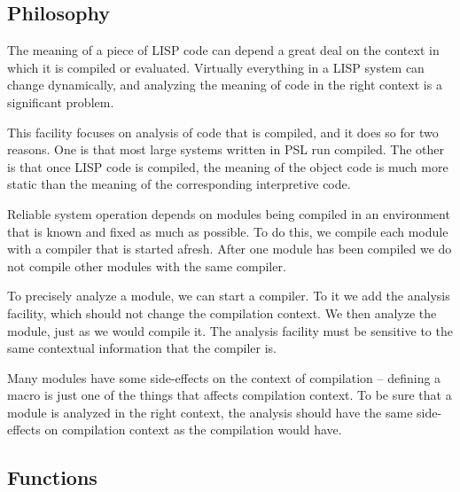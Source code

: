\subsection{Philosophy}

  The meaning of a piece of LISP code can depend a great deal on
the context in which it is compiled  or  evaluated.    Virtually
everything   in  a  LISP  system  can  change  dynamically,  and
analyzing the  meaning  of  code  in  the  right  context  is  a
significant problem.

  This  facility  focuses  on analysis of code that is compiled,
and it does so for two reasons.  One is that most large  systems
written  in  PSL run compiled.  The other is that once LISP code
is compiled, the meaning of the object code is much more  static
than the meaning of the corresponding interpretive code.

  Reliable system operation depends on modules being compiled in
an  environment that is known and fixed as much as possible.  To
do this, we compile each module with a compiler that is  started
afresh. After  one module has been compiled we do not compile
other modules with the same compiler.

  To precisely analyze a module, we can start a compiler.  To it
we add the  analysis  facility,  which  should  not  change  the
compilation  context. We then analyze the module, just as we
would compile it. The analysis facility must be sensitive  to
the same contextual information that the compiler is.

  Many   modules  have  some  side-effects  on  the  context  of
compilation -- defining a macro is just one of the  things  that
affects  compilation  context. To be sure that a module is
analyzed in the right context, the analysis should have the same
side-effects on compilation context as the compilation would
have.

\subsection{Functions}

